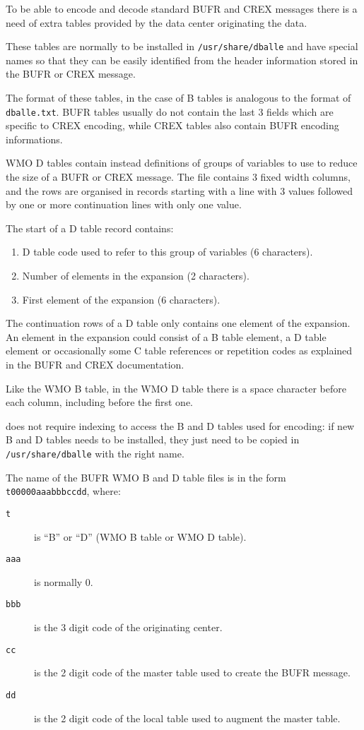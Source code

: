 To be able to encode and decode standard BUFR and CREX messages there is a need
of extra tables provided by the data center originating the data.

These tables are normally to be installed in {\tt /usr/share/dballe} and have
special names so that they can be easily identified from the header information
stored in the BUFR or CREX message.

The format of these tables, in the case of B tables is analogous to the format
of {\tt dballe.txt}.  BUFR tables usually do not contain the last 3 fields
which are specific to CREX encoding, while CREX tables also contain BUFR
encoding informations.

WMO D tables contain instead definitions of groups of variables to use to
reduce the size of a BUFR or CREX message.  The file contains 3 fixed width
columns, and the rows are organised in records starting with a line with 3
values followed by one or more continuation lines with only one value.

The start of a D table record contains:

\begin{enumerate}
\item D table code used to refer to this group of variables (6 characters).
\item Number of elements in the expansion (2 characters).
\item First element of the expansion (6 characters).
\end{enumerate}

The continuation rows of a D table only contains one element of the expansion.
An element in the expansion could consist of a B table element, a D table
element or occasionally some C table references or repetition codes as
explained in the BUFR and CREX documentation.

Like the WMO B table, in the WMO D table there is a space character before each
column, including before the first one.

\dballe{} does not require indexing to access the B and D tables used for
encoding: if new B and D tables needs to be installed, they just need to be
copied in {\tt /usr/share/dballe} with the right name.

The name of the BUFR WMO B and D table files is in the form
{\tt t00000aaabbbccdd}, where:

\begin{description}
\item[{\tt t}] is ``B'' or ``D'' (WMO B table or WMO D table).
\item[{\tt aaa}] is normally 0.
\item[{\tt bbb}] is the 3 digit code of the originating center.
\item[{\tt cc}] is the 2 digit code of the master table used to create the BUFR
                message.
\item[{\tt dd}] is the 2 digit code of the local table used to augment the
                master table.
\end{description}

